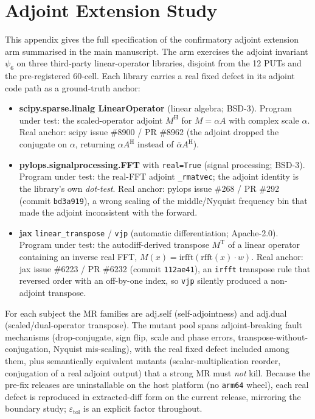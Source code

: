 \documentclass[manuscript,screen,review]{acmart}
\begin{document}
\section{Adjoint Extension Study}\label{h.-adjoint-extension-arm}

This appendix gives the full specification of the confirmatory adjoint
extension arm summarised in the main manuscript. The arm
exercises the adjoint invariant $\psi_6$ on three third-party
linear-operator libraries, disjoint from the 12 PUTs and the
pre-registered 60-cell. Each library carries a real fixed defect in its
adjoint code path as a ground-truth anchor:

\begin{itemize}

\item
  \textbf{scipy.sparse.linalg LinearOperator} (linear algebra; BSD-3).
  Program under test: the scaled-operator adjoint $M^{\mathrm{H}}$ for
  $M = \alpha A$ with complex scale $\alpha$. Real anchor: scipy issue
  \#8900 / PR \#8962 (the adjoint dropped the conjugate on $\alpha$,
  returning $\alpha A^{\mathrm{H}}$ instead of $\bar{\alpha}
  A^{\mathrm{H}}$).
\item
  \textbf{pylops.signalprocessing.FFT} with \texttt{real=True} (signal
  processing; BSD-3). Program under test: the real-FFT adjoint
  \texttt{\_rmatvec}; the adjoint identity is the library's own
  \emph{dot-test}. Real anchor: pylops issue \#268 / PR \#292 (commit
  \texttt{bd3a919}), a wrong scaling of the middle/Nyquist frequency bin
  that made the adjoint inconsistent with the forward.
\item
  \textbf{jax} \texttt{linear\_transpose} / \texttt{vjp} (automatic
  differentiation; Apache-2.0). Program under test: the autodiff-derived
  transpose $M^{\mathrm{T}}$ of a linear operator containing an inverse
  real FFT, $M(x) = \mathrm{irfft}(\mathrm{rfft}(x)\cdot w)$. Real anchor:
  jax issue \#6223 / PR \#6232 (commit \texttt{112ae41}), an
  \texttt{irfft} transpose rule that reversed order with an off-by-one
  index, so \texttt{vjp} silently produced a non-adjoint transpose.
\end{itemize}

For each subject the MR families are adj.self (self-adjointness) and
adj.dual (scaled/dual-operator transpose). The mutant pool spans
adjoint-breaking fault mechanisms (drop-conjugate, sign flip, scale and
phase errors, transpose-without-conjugation, Nyquist mis-scaling), with
the real fixed defect included among them, plus semantically equivalent
mutants (scalar-multiplication reorder, conjugation of a real adjoint
output) that a strong MR must \emph{not} kill. Because the pre-fix
releases are uninstallable on the host platform (no \texttt{arm64} wheel),
each real defect is reproduced in extracted-diff form on the current
release, mirroring the boundary study; $\varepsilon_{\mathrm{tol}}$ is an
explicit factor throughout.
\end{document}
